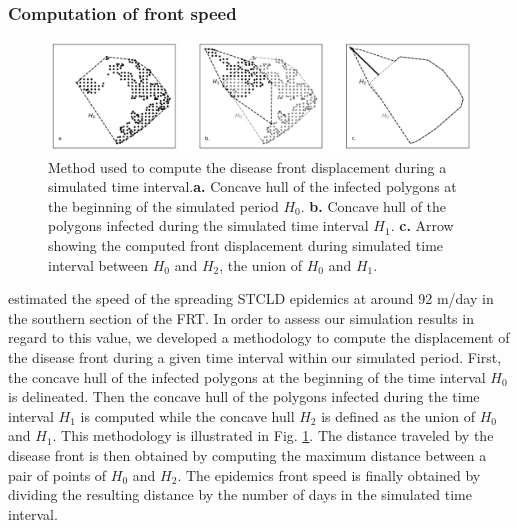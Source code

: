 \documentclass[utf8]{frontiersSCNS}
\begin{document}
\subsubsection{Computation of front speed}

\begin{figure}
    \centering
    \includegraphics[width=.99\linewidth]{figures/hull_example.png}
    \caption{Method used to compute the disease front displacement during a simulated time interval.\textbf{a.} Concave hull of the infected polygons at the beginning of the simulated period $H_0$. \textbf{b.} Concave hull of the polygons infected during the simulated time interval $H_1$. \textbf{c.} Arrow showing the computed front displacement during simulated time interval between $H_0$ and $H_2$, the union of $H_0$ and $H_1$.}
    \label{fig:hull}
\end{figure}

\cite{muller2020spatial} estimated the speed of the spreading STCLD epidemics at around 92 m/day in the southern section of the FRT. In order to assess our simulation results in regard to this value, we developed a methodology to compute the displacement of the disease front during a given time interval within our simulated period. First, the concave hull of the infected polygons at the beginning of the time interval $H_0$ is delineated. Then the concave hull of the polygons infected during the time interval $H_1$ is computed while the concave hull $H_2$ is defined as the union of $H_0$ and $H_1$. This methodology is illustrated in Fig. \ref{fig:hull}. The distance traveled by the disease front is then obtained by computing the maximum distance between a pair of points of $H_0$ and $H_2$. The epidemics front speed is finally obtained by dividing the resulting distance by the number of days in the simulated time interval.
\end{document}
